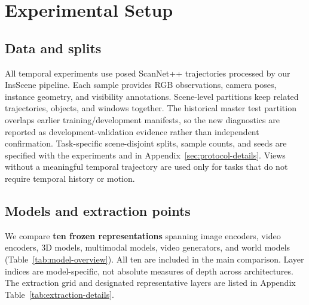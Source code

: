 \documentclass{article} %
\begin{document}
\section{Experimental Setup}
\label{sec:experimental-setup}

\subsection{Data and splits}
\label{sec:data-splits}
All temporal experiments use posed ScanNet++ trajectories
\citep{yeshwanth2023scannetpp} processed by our InsScene pipeline. Each sample
provides RGB observations, camera poses, instance geometry, and visibility
annotations. Scene-level partitions keep related trajectories, objects, and
windows together. The historical master test partition overlaps earlier
training/development manifests, so the new diagnostics are reported as
development-validation evidence rather than independent confirmation.
Task-specific scene-disjoint splits, sample counts, and seeds are specified
with the experiments and in Appendix~\ref{sec:protocol-details}.
Views without a meaningful temporal trajectory are used only for tasks that
do not require temporal history or motion.

\subsection{Models and extraction points}
\label{sec:model-layer-grid}
We compare \textbf{ten frozen representations} spanning image encoders, video
encoders, 3D models, multimodal models, video generators, and world models
(Table~\ref{tab:model-overview}). All ten are included in the main comparison.
Layer indices are model-specific, not absolute measures of depth across
architectures. The extraction grid and designated representative layers are
listed in Appendix Table~\ref{tab:extraction-details}.
\end{document}

